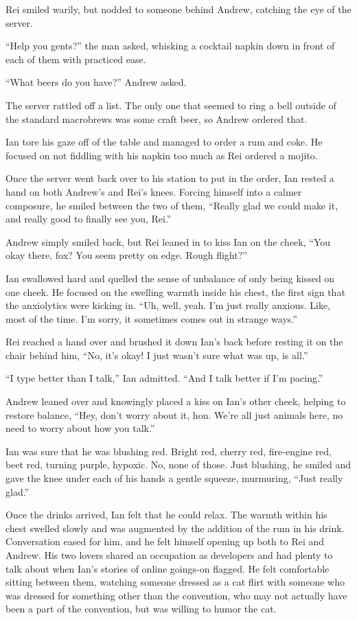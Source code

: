 Rei smiled warily, but nodded to someone behind Andrew, catching the eye of the server.

``Help you gents?'' the man asked, whisking a cocktail napkin down in front of each of them with practiced ease.

``What beers do you have?'' Andrew asked.

The server rattled off a list. The only one that seemed to ring a bell outside of the standard macrobrews was some craft beer, so Andrew ordered that.

Ian tore his gaze off of the table and managed to order a rum and coke. He focused on not fiddling with his napkin too much as Rei ordered a mojito.

Once the server went back over to his station to put in the order, Ian rested a hand on both Andrew's and Rei's knees. Forcing himself into a calmer composure, he smiled between the two of them, ``Really glad we could make it, and really good to finally see you, Rei.''

Andrew simply smiled back, but Rei leaned in to kiss Ian on the cheek, ``You okay there, fox? You seem pretty on edge. Rough flight?''

Ian swallowed hard and quelled the sense of unbalance of only being kissed on one cheek. He focused on the swelling warmth inside his chest, the first sign that the anxiolytics were kicking in. ``Uh, well, yeah. I'm just really anxious. Like, most of the time. I'm sorry, it sometimes comes out in strange ways.''

Rei reached a hand over and brushed it down Ian's back before resting it on the chair behind him, ``No, it's okay! I just wasn't sure what was up, is all.''

``I type better than I talk,'' Ian admitted. ``And I talk better if I'm pacing.''

Andrew leaned over and knowingly placed a kiss on Ian's other cheek, helping to restore balance, ``Hey, don't worry about it, hon. We're all just animals here, no need to worry about how you talk.''

Ian was sure that he was blushing red. Bright red, cherry red, fire-engine red, beet red, turning purple, hypoxic. No, none of those. Just blushing, he smiled and gave the knee under each of his hands a gentle squeeze, murmuring, ``Just really glad.''

Once the drinks arrived, Ian felt that he could relax. The warmth within his chest swelled slowly and was augmented by the addition of the rum in his drink. Conversation eased for him, and he felt himself opening up both to Rei and Andrew. His two lovers shared an occupation as developers and had plenty to talk about when Ian's stories of online goings-on flagged. He felt comfortable sitting between them, watching someone dressed as a cat flirt with someone who was dressed for something other than the convention, who may not actually have been a part of the convention, but was willing to humor the cat.

